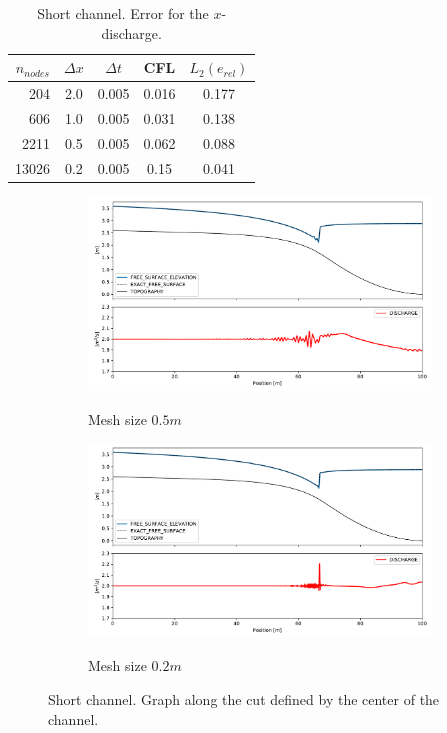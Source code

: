 \begin{table}
    \centering
    \begin{tabular}{>{\small}rcccc} \hline
    $n_{nodes}$ & $\Delta x$ & $\Delta t$ & CFL   & $L_2(e_{rel})$ \\ \hline
    204         &        2.0 &      0.005 & 0.016 & 0.177 \\
    606         &        1.0 &      0.005 & 0.031 & 0.138 \\
    2211        &        0.5 &      0.005 & 0.062 & 0.088 \\
    13026       &        0.2 &      0.005 & 0.15  & 0.041 \\ \hline
    \end{tabular}
    \caption{Short channel. Error for the $x$-discharge.}
    \label{hydraulic_jump_convergence_tab}
\end{table}


\begin{figure}
    \begin{subfigure}[b]{\textwidth}
        \centering
        \caption{Mesh size $0.5m$}
        \includegraphics[width=\textwidth]{img/eulerian/jump/mesh_0.5.pdf}
        \label{mac_donald_shock_graph_5}
    \end{subfigure}
    \begin{subfigure}[b]{\textwidth}
        \centering
        \caption{Mesh size $0.2m$}
        \includegraphics[width=\textwidth]{img/eulerian/jump/mesh_0.2.pdf}
        \label{mac_donald_shock_graph_2}
    \end{subfigure}
    \vspace*{-2em}
    \caption{Short channel. Graph along the cut defined by the center of the channel.}
\end{figure}


